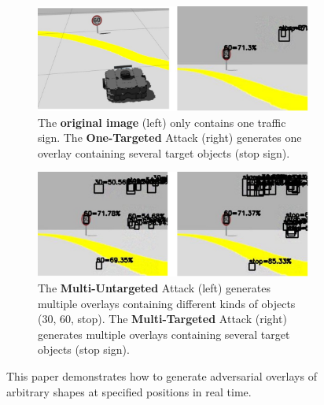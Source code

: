 \begin{figure}[tbp]
    \centering
    \begin{subfigure}[b]{\textwidth}
        \includegraphics[width=\linewidth]{figures/chapter_detection/detection/one.jpg}
        \caption{The \textbf{original image} (left) only contains one traffic sign. The \textbf{One-Targeted} Attack (right) generates one overlay containing several target objects (stop sign).}
        \label{fig:sparse-untar} 
    \end{subfigure}

    \begin{subfigure}[b]{\textwidth}
        \includegraphics[width=1\linewidth]{figures/chapter_detection/detection/multi.jpg}
        \caption{The \textbf{Multi-Untargeted} Attack (left) generates multiple overlays containing different kinds of objects (30, 60, stop). The \textbf{Multi-Targeted} Attack (right) generates multiple overlays containing several target objects (stop sign).}
        \label{fig:dense-untar}
    \end{subfigure}
    \caption{This paper demonstrates how to generate adversarial overlays of arbitrary shapes at specified positions in real time.}
    \label{fig:detection.overview}
\end{figure}

